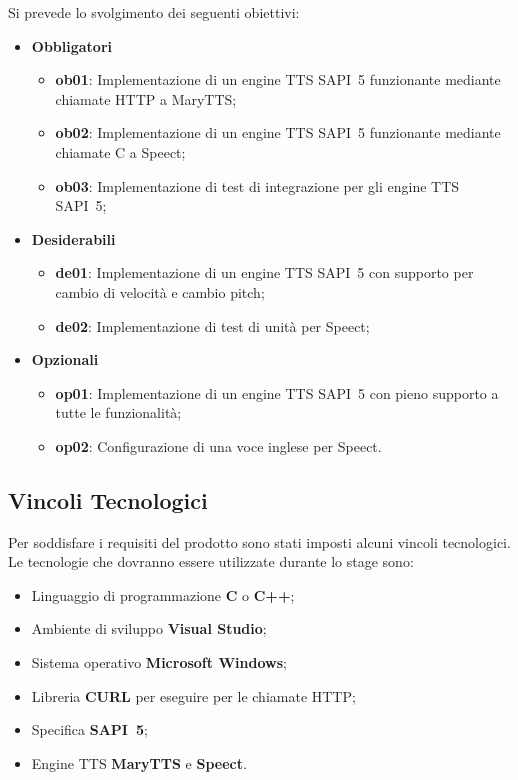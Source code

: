 Si prevede lo svolgimento dei seguenti obiettivi:
\begin{itemize}
	\item \textbf{Obbligatori}
	\begin{itemize}
		\item \textbf{ob01}: Implementazione di un engine TTS SAPI~5 funzionante mediante chiamate HTTP a MaryTTS;
		\item \textbf{ob02}: Implementazione di un engine TTS SAPI~5 funzionante mediante chiamate C a Speect;
		\item \textbf{ob03}: Implementazione di test di integrazione per gli engine TTS SAPI~5;
	\end{itemize}
	
	\item \textbf{Desiderabili} 
	\begin{itemize}
		\item \textbf{de01}: Implementazione di un engine TTS SAPI~5 con supporto per cambio di velocità e cambio pitch;
		\item \textbf{de02}: Implementazione di test di unità per Speect;
	\end{itemize}
	
	\item \textbf{Opzionali}
	\begin{itemize}
		\item \textbf{op01}: Implementazione di un engine TTS SAPI~5 con pieno supporto a tutte le funzionalità;
		\item \textbf{op02}: Configurazione di una voce inglese per Speect.
	\end{itemize}
\end{itemize}

\subsection{Vincoli Tecnologici}
Per soddisfare i requisiti del prodotto sono stati imposti alcuni vincoli tecnologici.\\
Le tecnologie che dovranno essere utilizzate durante lo stage sono:
\begin{itemize}
	\item Linguaggio di programmazione \textbf{C} o \textbf{C++};
	\item Ambiente di sviluppo \textbf{Visual Studio};
	\item Sistema operativo \textbf{Microsoft Windows};
	\item Libreria \textbf{CURL} per eseguire per le chiamate HTTP;
	\item Specifica \textbf{SAPI~5};
	\item Engine TTS \textbf{MaryTTS} e \textbf{Speect}.
\end{itemize}

